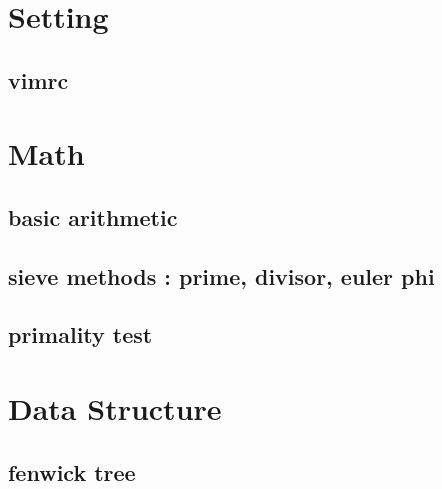 \documentclass[10pt,landscape,a4paper,twocolumn]{article}
\begin{document}
\section{Setting}
\subsection{vimrc}



\section{Math}

\subsection{basic arithmetic}


\subsection{sieve methods : prime, divisor, euler phi}


\subsection{primality test}




\section{Data Structure}

\subsection{fenwick tree}
\end{document}
